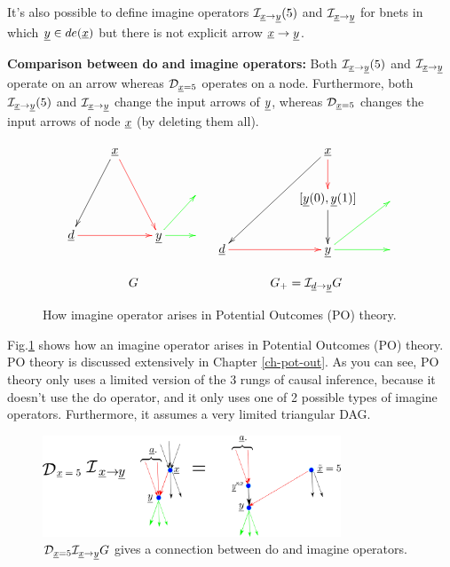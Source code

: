 It's also possible to define
imagine operators $\cali_{\rvx\rarrow\rvy}(5)$
and $\cali_{\rvx\rarrow\rvy}$ for bnets
in which $\rvy\in de(\rvx)$
but there is not
explicit arrow $\rvx\rarrow \rvy$.


{\bf Comparison between do and imagine
operators:} Both
$\cali_{\rvx\rarrow\rvy}(5)$
and $\cali_{\rvx\rarrow\rvy}$
operate on an arrow
whereas 
$\cald_{\rvx=5}$
 operates on a node.
Furthermore, both $\cali_{\rvx\rarrow\rvy}(5)$
and $\cali_{\rvx\rarrow\rvy}$
change the input arrows of $\rvy$,
whereas $\cald_{\rvx=5}$
changes the input arrows of node $\rvx$ (by deleting them all).






\begin{figure}[h!]
$$
\begin{array}{ccccc}
\xymatrix{
&\rvx\ar@[red][ddr]\ar[ddl]
\\
&&&
\\
\rvd\ar@[red][rr]
&
&\rvy\ar@[green][r]
\ar@[green][ur]
&
}
&
\xymatrix{
&&\rvx\ar[ddll]\ar@[red][d]
\\
&&[\rvy(0),\rvy(1)]\ar[d]
&
\\
\rvd\ar@[red][rr]
&
&\rvy\ar@[green][r]
\ar@[green][ur]
&
}
\\
\\
G&G_+=\cali_{\rvd\rarrow\rvy}G
\end{array}
$$
\caption{How
 imagine operator
arises in
Potential Outcomes (PO)
theory.
}
\label{fig-counterf-G-im-y0-y1}
\end{figure}
Fig.\ref{fig-counterf-G-im-y0-y1}
shows how an
imagine operator arises
in Potential Outcomes (PO) theory.
PO theory is discussed extensively
in Chapter \ref{ch-pot-out}.
As you can see, PO theory
only uses a limited version
of the 3 rungs
of causal inference, because it
doesn't use the do operator,
and it only uses one
of 2 possible types of
imagine operators.
Furthermore,
it assumes a
very limited triangular DAG.


\begin{figure}[h!]
\centering
\includegraphics[width=3.5in]
{counterf/rho-kappa.png}
\caption{$\cald_{\rvx=5}\cali_{\rvx\rarrow \rvy}G$
gives a connection
between do and imagine operators.
}
\label{fig-rho-kappa}
\end{figure}

